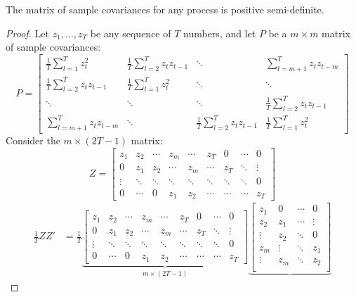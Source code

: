 \documentclass[DIV=14,titlepage=false]{scrreprt}
\begin{document}
\begin{lemma}
    The matrix of sample covariances for any process is positive semi-definite.
\end{lemma}
\begin{proof}
    Let $z_1, \dots, z_T$ be any sequence of $T$ numbers, and let $P$ be a $m\times m$ matrix of sample covariances:
    \[ P=
    \begin{bmatrix}
        \frac{1}{T} \sum_{l=1}^{T}z_t^2 & \frac{1}{T} \sum_{l=2}^{T}z_tz_{t-1} & \ddots & \sum_{l=m+1}^{T}z_tz_{t-m}\\
        \frac{1}{T} \sum_{l=2}^{T}z_tz_{t-1} & \frac{1}{T} \sum_{l=1}^{T}z_t^2 & \ddots & \ddots\\
        \ddots & \ddots & \ddots & \frac{1}{T} \sum_{l=2}^{T}z_tz_{t-1}\\
        \sum_{l=m+1}^{T}z_tz_{t-m} & \ddots & \frac{1}{T} \sum_{l=2}^{T}z_tz_{t-1} &  \frac{1}{T} \sum_{l=1}^{T}z_t^2
    \end{bmatrix}\]
    Consider the $m \times (2T-1)$ matrix:
    \[
    Z= \begin{bmatrix}
        z_1&z_2&\cdots&z_m&\cdots&z_T&0&\cdots&0\\
        0&z_1&z_2&\cdots&z_m&\cdots&z_T&\ddots&\vdots\\
        \vdots & \ddots&\ddots&\ddots&\ddots&\ddots&\ddots&\ddots&0\\
        0&\cdots&0&z_1&z_2&\cdots&\cdots&\cdots&z_T
    \end{bmatrix}    
    \]
    \begin{align*}
         \frac{1}{T}ZZ' &= \frac{1}{T}
         \underbrace{\begin{bmatrix}
            z_1&z_2&\cdots&z_m&\cdots&z_T&0&\cdots&0\\
            0&z_1&z_2&\cdots&z_m&\cdots&z_T&\ddots&\vdots\\
            \vdots & \ddots&\ddots&\ddots&\ddots&\ddots&\ddots&\ddots&0\\
            0&\cdots&0&z_1&z_2&\cdots&\cdots&\cdots&z_T
        \end{bmatrix}}_{m\times(2T-1)}
        \underbrace{\begin{bmatrix}
            z_1 & 0 & \cdots & 0 \\
            z_2 & z_1 & \cdots & \vdots \\
            \vdots & z_2 & \ddots & 0 \\
            z_m & \vdots & \ddots & z_1 \\
            \vdots & z_m & \ddots & z_2 \\

\end{bmatrix}}
\end{align*}
\end{proof}
\end{document}
